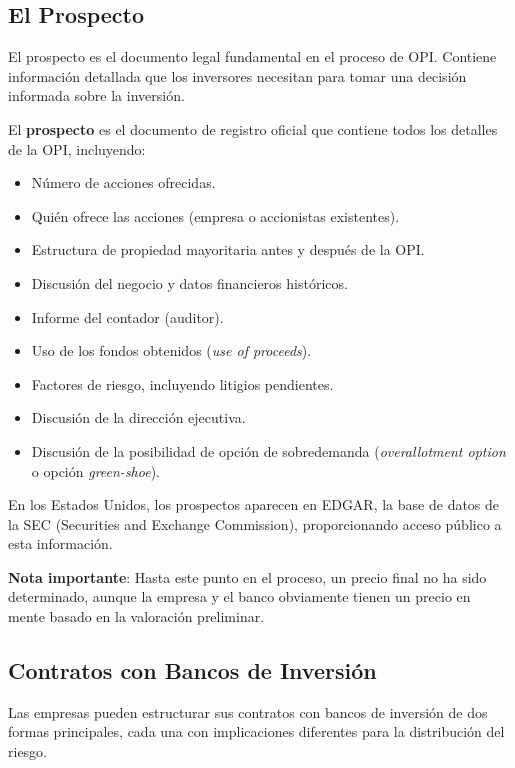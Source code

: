 \subsection{El Prospecto}

El prospecto es el documento legal fundamental en el proceso de OPI. Contiene información detallada que los inversores necesitan para tomar una decisión informada sobre la inversión.

\begin{definicion}[Prospecto]
El \textbf{prospecto} es el documento de registro oficial que contiene todos los detalles de la OPI, incluyendo:
\begin{itemize}
\item Número de acciones ofrecidas.
\item Quién ofrece las acciones (empresa o accionistas existentes).
\item Estructura de propiedad mayoritaria antes y después de la OPI.
\item Discusión del negocio y datos financieros históricos.
\item Informe del contador (auditor).
\item Uso de los fondos obtenidos (\textit{use of proceeds}).
\item Factores de riesgo, incluyendo litigios pendientes.
\item Discusión de la dirección ejecutiva.
\item Discusión de la posibilidad de opción de sobredemanda (\textit{overallotment option} o opción \textit{green-shoe}).
\end{itemize}
\end{definicion}

En los Estados Unidos, los prospectos aparecen en EDGAR, la base de datos de la SEC (Securities and Exchange Commission), proporcionando acceso público a esta información.

\textbf{Nota importante}: Hasta este punto en el proceso, un precio final no ha sido determinado, aunque la empresa y el banco obviamente tienen un precio en mente basado en la valoración preliminar.

\subsection{Contratos con Bancos de Inversión}

Las empresas pueden estructurar sus contratos con bancos de inversión de dos formas principales, cada una con implicaciones diferentes para la distribución del riesgo.


